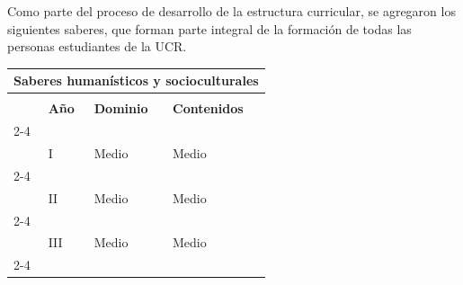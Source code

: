 \begin{refsection}
Como parte del proceso de desarrollo de la estructura curricular, se agregaron los siguientes saberes, que forman parte integral de la formación de todas las personas estudiantes de la UCR.

\begin{table}[H]
\begin{center}
\begin{tabular}{|llll|}
\hline
\multicolumn{4}{|c|}{\cellcolor[HTML]{00C0F3} \textbf{Saberes humanísticos y socioculturales}} \\ \hline
\multicolumn{1}{|l|}{} & \multicolumn{1}{l|}{\cellcolor[HTML]{8ED8F8}} & \multicolumn{1}{l|}{\cellcolor[HTML]{8ED8F8}} & \cellcolor[HTML]{8ED8F8} \\
\multicolumn{1}{|l|}{} & \multicolumn{1}{l|}{\multirow{-2}{*}{\cellcolor[HTML]{8ED8F8} \textbf{Año}}} & \multicolumn{1}{l|}{\multirow{-2}{*}{\cellcolor[HTML]{8ED8F8} \textbf{Dominio}}} & \multirow{-2}{*}{\cellcolor[HTML]{8ED8F8} \textbf{Contenidos}} \\ \cline{2-4} 
\multicolumn{1}{|l|}{} & \multicolumn{1}{l|}{} & \multicolumn{1}{l|}{} &  \\
\multicolumn{1}{|l|}{} & \multicolumn{1}{l|}{\multirow{-2}{*}{I}} & \multicolumn{1}{l|}{\multirow{-2}{*}{Medio}} & \multirow{-2}{*}{Medio} \\ \cline{2-4} 
\multicolumn{1}{|l|}{} & \multicolumn{1}{l|}{} & \multicolumn{1}{l|}{} &  \\
\multicolumn{1}{|l|}{} & \multicolumn{1}{l|}{\multirow{-2}{*}{II}} & \multicolumn{1}{l|}{\multirow{-2}{*}{Medio}} & \multirow{-2}{*}{Medio} \\ \cline{2-4} 
\multicolumn{1}{|l|}{} & \multicolumn{1}{l|}{} & \multicolumn{1}{l|}{} &  \\
\multicolumn{1}{|l|}{} & \multicolumn{1}{l|}{\multirow{-2}{*}{III}} & \multicolumn{1}{l|}{\multirow{-2}{*}{Medio}} & \multirow{-2}{*}{Medio} \\ \cline{2-4} 
\multicolumn{1}{|l|}{} & \multicolumn{1}{l|}{} & \multicolumn{1}{l|}{} &  \\

\end{tabular}
\end{center}
\end{table}
\end{refsection}
